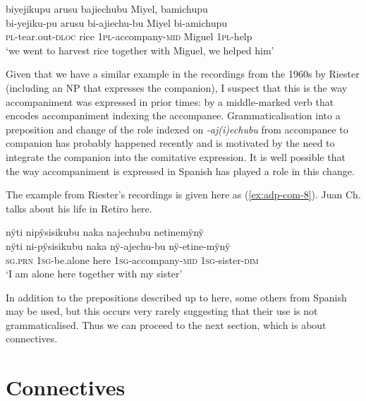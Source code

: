 \ea\label{ex:adp-com-7}
\begingl
\glpreamble biyejikupu arusu bajiechubu Miyel, bamichupu\\
\gla bi-yejiku-pu arusu bi-ajiechu-bu Miyel bi-amichupu\\
\textsc{pl}-tear.out-\textsc{dloc} rice 1\textsc{pl}-accompany-\textsc{mid} Miguel 1\textsc{pl}-help\\
\glft ‘we went to harvest rice together with Miguel, we helped him’
\endgl
\trailingcitation{[oxx-e120414ls-1a.120]}
\xe

Given that we have a similar example in the recordings from the 1960s by Riester (including an NP that expresses the companion), I suspect that this is the way accompaniment was expressed in prior times: by a middle-marked verb that encodes accompaniment indexing the accompanee. Grammaticalisation into a preposition and change of the role indexed on \textit{-aj(i)echubu} from accompanee to companion has probably happened recently and is motivated by the need to integrate the companion into the comitative expression. It is well possible that the way accompaniment is expressed in Spanish has played a role in this change.

The example from Riester’s recordings is given here as (\ref{ex:adp-com-8}). Juan Ch. talks about his life in Retiro here.

\ea\label{ex:adp-com-8}
\begingl
\glpreamble nÿti nipÿsisikubu naka najechubu netinemÿnÿ\\
\gla nÿti ni-pÿsisikubu naka nÿ-ajechu-bu nÿ-etine-mÿnÿ\\
\textsc{sg.prn} 1\textsc{sg}-be.alone here 1\textsc{sg}-accompany-\textsc{mid} 1\textsc{sg}-sister-\textsc{dim}\\
\glft ‘I am alone here together with my sister’
\endgl
\trailingcitation{[nxx-p630101g-1.163-164]}
\xe


In addition to the prepositions described up to here, some others from Spanish may be used, but this occurs very rarely suggesting that their use is not grammaticalised. Thus we can proceed to the next section, which is about connectives.

\section{Connectives}\label{sec:Conjunctions}

